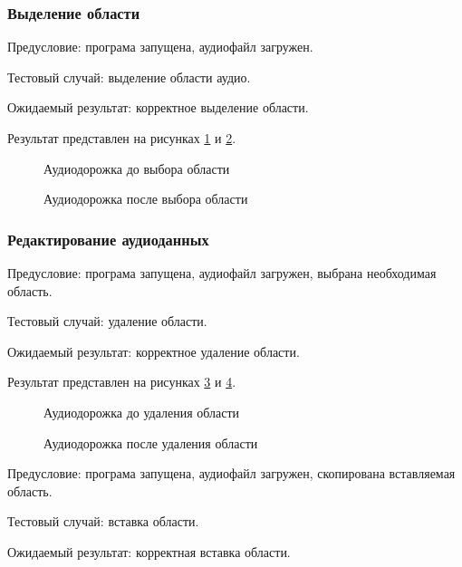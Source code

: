 \subsubsection{Выделение области}
Предусловие: програма запущена, аудиофайл загружен.

Тестовый случай: выделение области аудио.

Ожидаемый результат: корректное выделение области.

Результат представлен на рисунках \ref{test_case5:image} и \ref{test_case6:image}.

\begin{figure}[H]
	\caption{Аудиодорожка до выбора области}
	\label{test_case5:image}
\end{figure}

\begin{figure}[H] 
	\caption{Аудиодорожка после выбора области}
	\label{test_case6:image}
\end{figure}

\subsubsection{Редактирование аудиоданных}
Предусловие: програма запущена, аудиофайл загружен, выбрана необходимая область.

Тестовый случай: удаление области.

Ожидаемый результат: корректное удаление области.

Результат представлен на рисунках \ref{test_case7:image} и \ref{test_case8:image}.

\begin{figure}[H]
	\caption{Аудиодорожка до удаления области}
	\label{test_case7:image}
\end{figure}

\begin{figure}[H] 
	\caption{Аудиодорожка после удаления области}
	\label{test_case8:image}
\end{figure}

Предусловие: програма запущена, аудиофайл загружен, скопирована вставляемая область.

Тестовый случай: вставка области.

Ожидаемый результат: корректная вставка области.

